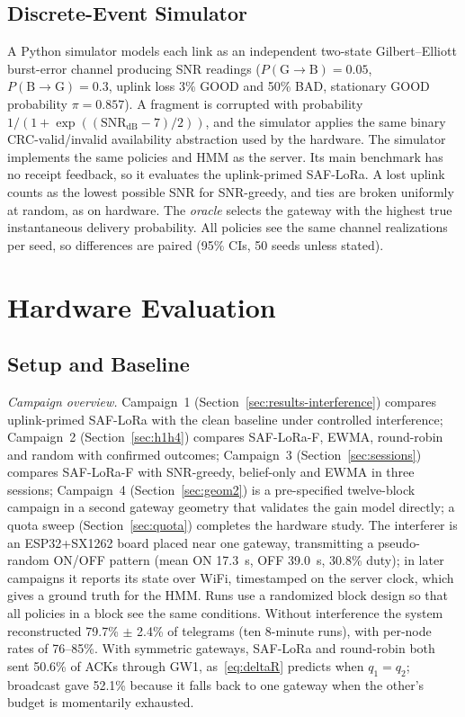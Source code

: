 \documentclass[journal]{IEEEtran}
\begin{document}
\subsection{Discrete-Event Simulator}
\label{sec:sim}
A Python simulator models each link as an independent two-state Gilbert--Elliott burst-error channel producing SNR readings ($P(\text{G}\!\to\!\text{B})=0.05$, $P(\text{B}\!\to\!\text{G})=0.3$, uplink loss 3\% GOOD and 50\% BAD, stationary GOOD probability $\pi=0.857$). A fragment is corrupted with probability $1/(1+\exp((\text{SNR}_{\text{dB}}-7)/2))$, and the simulator applies the same binary CRC-valid/invalid availability abstraction used by the hardware. The simulator implements the same policies and HMM as the server. Its main benchmark has no receipt feedback, so it evaluates the uplink-primed SAF-LoRa. A lost uplink counts as the lowest possible SNR for SNR-greedy, and ties are broken uniformly at random, as on hardware. The \emph{oracle} selects the gateway with the highest true instantaneous delivery probability. All policies see the same channel realizations per seed, so differences are paired (95\% CIs, 50 seeds unless stated).

\section{Hardware Evaluation}

\subsection{Setup and Baseline}
\label{sec:results-policy-clean}
\textit{Campaign overview.} Campaign~1 (Section~\ref{sec:results-interference}) compares uplink-primed SAF-LoRa with the clean baseline under controlled interference; Campaign~2 (Section~\ref{sec:h1h4}) compares SAF-LoRa-F, EWMA, round-robin and random with confirmed outcomes; Campaign~3 (Section~\ref{sec:sessions}) compares SAF-LoRa-F with SNR-greedy, belief-only and EWMA in three sessions; Campaign~4 (Section~\ref{sec:geom2}) is a pre-specified twelve-block campaign in a second gateway geometry that validates the gain model directly; a quota sweep (Section~\ref{sec:quota}) completes the hardware study. The interferer is an ESP32+SX1262 board placed near one gateway, transmitting a pseudo-random ON/OFF pattern (mean ON 17.3~s, OFF 39.0~s, 30.8\% duty); in later campaigns it reports its state over WiFi, timestamped on the server clock, which gives a ground truth for the HMM. Runs use a randomized block design so that all policies in a block see the same conditions. Without interference the system reconstructed 79.7\% $\pm$ 2.4\% of telegrams (ten 8-minute runs), with per-node rates of 76--85\%. With symmetric gateways, SAF-LoRa and round-robin both sent 50.6\% of ACKs through GW1, as~\eqref{eq:deltaR} predicts when $q_1=q_2$; broadcast gave 52.1\% because it falls back to one gateway when the other's budget is momentarily exhausted.
\end{document}
